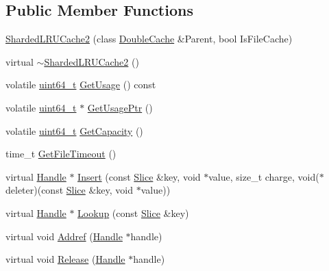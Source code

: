 \subsection*{Public Member Functions}
\begin{DoxyCompactItemize}
\item 
\hyperlink{classleveldb_1_1_sharded_l_r_u_cache2_ae2296aa2f9168ac5eda0cb66a6282e5a}{Sharded\+L\+R\+U\+Cache2} (class \hyperlink{classleveldb_1_1_double_cache}{Double\+Cache} \&Parent, bool Is\+File\+Cache)
\item 
virtual \hyperlink{classleveldb_1_1_sharded_l_r_u_cache2_ab20d0cf97c378f44f5a51d3b15fd1521}{$\sim$\+Sharded\+L\+R\+U\+Cache2} ()
\item 
volatile \hyperlink{stdint_8h_aaa5d1cd013383c889537491c3cfd9aad}{uint64\+\_\+t} \hyperlink{classleveldb_1_1_sharded_l_r_u_cache2_ad6d0402690ab2d747bcd4e75ecdb44a7}{Get\+Usage} () const 
\item 
volatile \hyperlink{stdint_8h_aaa5d1cd013383c889537491c3cfd9aad}{uint64\+\_\+t} $\ast$ \hyperlink{classleveldb_1_1_sharded_l_r_u_cache2_a25378f0266db5f8d12089b7526a45bd9}{Get\+Usage\+Ptr} ()
\item 
volatile \hyperlink{stdint_8h_aaa5d1cd013383c889537491c3cfd9aad}{uint64\+\_\+t} \hyperlink{classleveldb_1_1_sharded_l_r_u_cache2_a45a0a546a2c2f39ca631feb3d33c8a83}{Get\+Capacity} ()
\item 
time\+\_\+t \hyperlink{classleveldb_1_1_sharded_l_r_u_cache2_a917e57c7970d9efaefb8a56c9d687591}{Get\+File\+Timeout} ()
\item 
virtual \hyperlink{structleveldb_1_1_cache_1_1_handle}{Handle} $\ast$ \hyperlink{classleveldb_1_1_sharded_l_r_u_cache2_af038d5d9763066a12ac3b9f50ba366a8}{Insert} (const \hyperlink{classleveldb_1_1_slice}{Slice} \&key, void $\ast$value, size\+\_\+t charge, void($\ast$deleter)(const \hyperlink{classleveldb_1_1_slice}{Slice} \&key, void $\ast$value))
\item 
virtual \hyperlink{structleveldb_1_1_cache_1_1_handle}{Handle} $\ast$ \hyperlink{classleveldb_1_1_sharded_l_r_u_cache2_aa4a52c77ea98f905a675ef8ef09814ab}{Lookup} (const \hyperlink{classleveldb_1_1_slice}{Slice} \&key)
\item 
virtual void \hyperlink{classleveldb_1_1_sharded_l_r_u_cache2_a53f8f6583caf78942bd00d0a5133b4c1}{Addref} (\hyperlink{structleveldb_1_1_cache_1_1_handle}{Handle} $\ast$handle)
\item 
virtual void \hyperlink{classleveldb_1_1_sharded_l_r_u_cache2_ae8813201027d831d0593d95643272646}{Release} (\hyperlink{structleveldb_1_1_cache_1_1_handle}{Handle} $\ast$handle)

\end{DoxyCompactItemize}
